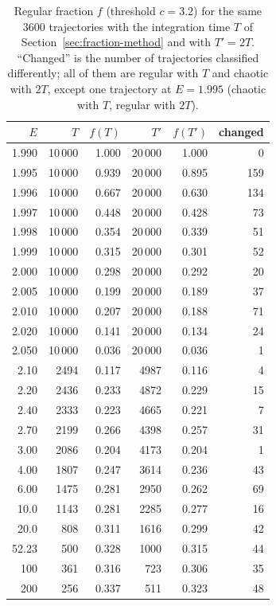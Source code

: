 \documentclass[11pt,a4paper]{article}
\begin{document}
\begin{table}[H]
\centering
\caption{Regular fraction $f$ (threshold $c=3.2$) for the same $3600$
trajectories with the integration time $T$ of
Section~\ref{sec:fraction-method} and with $T'=2T$.
``Changed'' is the number of trajectories classified differently; all of them
are regular with $T$ and chaotic with $2T$, except one trajectory at
$E=1.995$ (chaotic with $T$, regular with $2T$).}
\label{tab:convergence}
\begin{tabular}{@{}rrrrrr@{}}
\toprule
$E$ & $T$ & $f(T)$ & $T'$ & $f(T')$ & changed\\
\midrule
1.990 & 10\,000 & 1.000 & 20\,000 & 1.000 & 0\\
1.995 & 10\,000 & 0.939 & 20\,000 & 0.895 & 159\\
1.996 & 10\,000 & 0.667 & 20\,000 & 0.630 & 134\\
1.997 & 10\,000 & 0.448 & 20\,000 & 0.428 & 73\\
1.998 & 10\,000 & 0.354 & 20\,000 & 0.339 & 51\\
1.999 & 10\,000 & 0.315 & 20\,000 & 0.301 & 52\\
2.000 & 10\,000 & 0.298 & 20\,000 & 0.292 & 20\\
2.005 & 10\,000 & 0.199 & 20\,000 & 0.189 & 37\\
2.010 & 10\,000 & 0.207 & 20\,000 & 0.188 & 71\\
2.020 & 10\,000 & 0.141 & 20\,000 & 0.134 & 24\\
2.050 & 10\,000 & 0.036 & 20\,000 & 0.036 & 1\\
\midrule
2.10  & 2494 & 0.117 & 4987 & 0.116 & 4\\
2.20  & 2436 & 0.233 & 4872 & 0.229 & 15\\
2.40  & 2333 & 0.223 & 4665 & 0.221 & 7\\
2.70  & 2199 & 0.266 & 4398 & 0.257 & 31\\
3.00  & 2086 & 0.204 & 4173 & 0.204 & 1\\
4.00  & 1807 & 0.247 & 3614 & 0.236 & 43\\
6.00  & 1475 & 0.281 & 2950 & 0.262 & 69\\
10.0  & 1143 & 0.281 & 2285 & 0.277 & 16\\
20.0  & 808  & 0.311 & 1616 & 0.299 & 42\\
52.23 & 500  & 0.328 & 1000 & 0.315 & 44\\
100   & 361  & 0.316 & 723  & 0.306 & 35\\
200   & 256  & 0.337 & 511  & 0.323 & 48\\
\bottomrule
\end{tabular}
\end{table}
\end{document}
